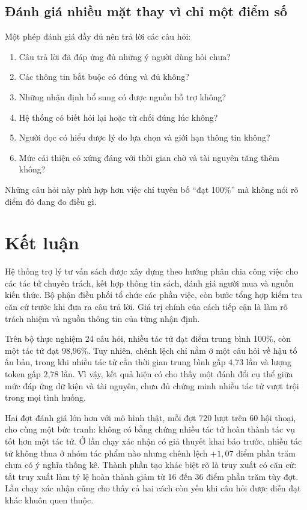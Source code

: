 \subsection{Đánh giá nhiều mặt thay vì chỉ một điểm số}
Một phép đánh giá đầy đủ nên trả lời các câu hỏi:
\begin{enumerate}
\item Câu trả lời đã đáp ứng đủ những ý người dùng hỏi chưa?
\item Các thông tin bắt buộc có đúng và đủ không?
\item Những nhận định bổ sung có được nguồn hỗ trợ không?
\item Hệ thống có biết hỏi lại hoặc từ chối đúng lúc không?
\item Người đọc có hiểu được lý do lựa chọn và giới hạn thông tin không?
\item Mức cải thiện có xứng đáng với thời gian chờ và tài nguyên tăng thêm không?
\end{enumerate}
Những câu hỏi này phù hợp hơn việc chỉ tuyên bố ``đạt 100\%'' mà không nói rõ điểm đó đang đo điều gì.

\section{Kết luận}
Hệ thống trợ lý tư vấn sách được xây dựng theo hướng phân chia công việc cho các tác tử chuyên trách, kết hợp thông tin sách, đánh giá người mua và nguồn kiến thức. Bộ phận điều phối tổ chức các phần việc, còn bước tổng hợp kiểm tra căn cứ trước khi đưa ra câu trả lời. Giá trị chính của cách tiếp cận là làm rõ trách nhiệm và nguồn thông tin của từng nhận định.

Trên bộ thực nghiệm 24 câu hỏi, nhiều tác tử đạt điểm trung bình 100\%, còn một tác tử đạt 98,96\%. Tuy nhiên, chênh lệch chỉ nằm ở một câu hỏi về hậu tố ấn bản, trong khi nhiều tác tử cần thời gian trung bình gấp 4,73 lần và lượng token gấp 2,78 lần. Vì vậy, kết quả hiện có cho thấy một đánh đổi cụ thể giữa mức đáp ứng dữ kiện và tài nguyên, chưa đủ chứng minh nhiều tác tử vượt trội trong mọi tình huống.

Hai đợt đánh giá lớn hơn với mô hình thật, mỗi đợt 720 lượt trên 60 hội thoại, cho cùng một bức tranh: không có bằng chứng nhiều tác tử hoàn thành tác vụ tốt hơn một tác tử. Ở lần chạy xác nhận có giả thuyết khai báo trước, nhiều tác tử không thua ở nhóm tác phẩm nào nhưng chênh lệch $+1{,}07$ điểm phần trăm chưa có ý nghĩa thống kê. Thành phần tạo khác biệt rõ là truy xuất có căn cứ: tắt truy xuất làm tỷ lệ hoàn thành giảm từ 16 đến 36 điểm phần trăm tùy đợt. Lần chạy xác nhận cũng cho thấy cả hai cách còn yếu khi câu hỏi được diễn đạt khác khuôn quen thuộc.

